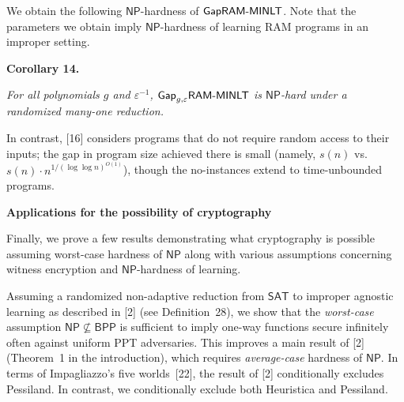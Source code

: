 \documentclass[10pt,a4paper]{article}
\begin{document}
We obtain the following ${\mathsf{NP}}$-hardness of ${\sf Gap}{\sf RAM}\text{-}{\sf MINLT}$. Note that the parameters we obtain imply ${\mathsf{NP}}$-hardness of learning RAM programs in an improper setting.\par





\par\medskip\noindent\textbf{
\textbf{Corollary 14}\textbf{.}
}\par



\emph{For all polynomials $g$ and $\varepsilon^{-1}$, ${\sf Gap}_{g,\varepsilon}{\sf RAM}\text{-}{\sf MINLT}$ is ${\mathsf{NP}}$-hard under a randomized many-one reduction.}\par






In contrast, [16] considers programs that do not require random access to their inputs; the gap in program size achieved there is small (namely, $s(n)$ vs. $s(n)\cdot n^{1/(\log\log n)^{O(1)}}$), though the no-instances extend to time-unbounded programs.\par





\par\medskip\noindent\textbf{Applications for the possibility of cryptography}\par




Finally, we prove a few results demonstrating what cryptography is possible assuming worst-case hardness of ${\mathsf{NP}}$ along with various assumptions concerning witness encryption and ${\mathsf{NP}}$-hardness of learning.\par




Assuming a randomized non-adaptive reduction from ${\mathsf{SAT}}$ to improper agnostic learning as described in [2] (see Definition 28), we show that the \emph{worst-case} assumption ${\mathsf{NP}}\nsubseteq{\mathsf{BPP}}$ is sufficient to imply one-way functions secure infinitely often against uniform PPT adversaries. This improves a main result of [2] (Theorem 1 in the introduction), which requires \emph{average-case} hardness of ${\mathsf{NP}}$. In terms of Impagliazzo’s five worlds [22], the result of [2] conditionally excludes Pessiland. In contrast, we conditionally exclude both Heuristica and Pessiland.\par
\end{document}
